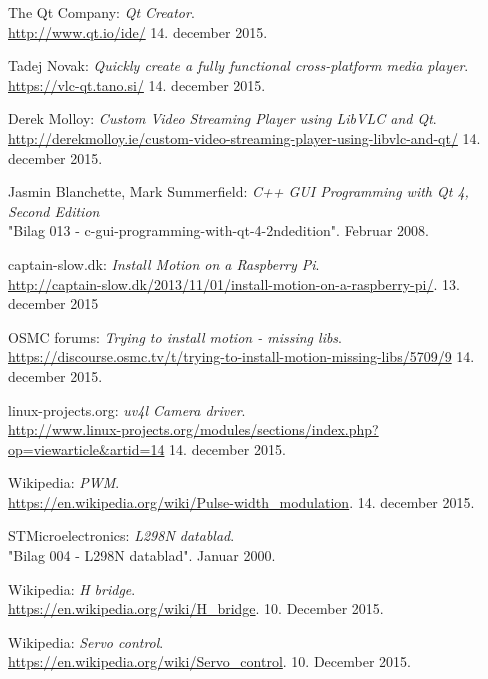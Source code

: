 \begin{thebibliography}{2}
 The Qt Company: \textit{Qt Creator}. \\
\url{http://www.qt.io/ide/} 14. december 2015.

 Tadej Novak: \textit{Quickly create a fully functional cross-platform media player}. \\
\url{https://vlc-qt.tano.si/} 14. december 2015.

 Derek Molloy: \textit{Custom Video Streaming Player using LibVLC and Qt}. \\
\url{http://derekmolloy.ie/custom-video-streaming-player-using-libvlc-and-qt/} 14. december 2015.

 Jasmin Blanchette, Mark Summerfield: \textit{C++ GUI Programming with Qt 4, Second Edition} \\
"Bilag 013 - c-gui-programming-with-qt-4-2ndedition". Februar 2008.

 captain-slow.dk: \textit{Install Motion on a Raspberry Pi}. \\
\url{http://captain-slow.dk/2013/11/01/install-motion-on-a-raspberry-pi/}. 13. december 2015

 OSMC forums: \textit{Trying to install motion - missing libs}. \\
\url{https://discourse.osmc.tv/t/trying-to-install-motion-missing-libs/5709/9} 14. december 2015.

 linux-projects.org: \textit{uv4l Camera driver}. \\
\url{http://www.linux-projects.org/modules/sections/index.php?op=viewarticle&artid=14} 14. december 2015.

 Wikipedia: \textit{PWM}.\\
\url{https://en.wikipedia.org/wiki/Pulse-width_modulation}. 14. december 2015.

 STMicroelectronics: \textit{L298N datablad}. \\
"Bilag 004 - L298N datablad". Januar 2000.

 Wikipedia: \textit{H bridge}.\\
\url{https://en.wikipedia.org/wiki/H_bridge}. 10. December 2015.

 Wikipedia: \textit{Servo control}. \\
\url{https://en.wikipedia.org/wiki/Servo_control}. 10. December 2015.


\end{thebibliography}
